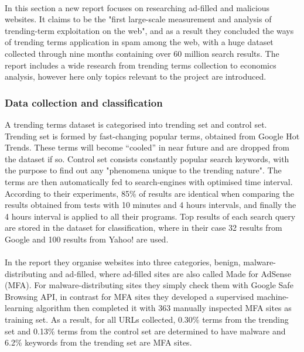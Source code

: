 \paragraph{}
In this section a new report focuses on researching ad-filled and malicious
websites.\cite{moore2011fashion} It claims to be the "first large-scale measurement
and analysis of trending-term exploitation on the web", and as a result they
concluded the ways of trending terms application in spam among the web, with a
huge dataset collected through nine months containing over 60 million search
results. The report includes a wide research from trending terms collection to 
economics analysis, however here only topics relevant to the 
project are introduced. 
\subsubsection{Data collection and classification}
A trending terms dataset is categorised into trending set and control set. 
Trending set is formed by fast-changing popular terms, obtained from Google 
Hot Trends. These terms will become ``cooled'' in near future and are dropped 
from the dataset if so. Control set consists constantly popular search 
keywords, with the purpose to find out any "phenomena unique to the trending 
nature".\cite{moore2011fashion} The terms are then automatically fed to search-engines with optimised 
time interval. According to their experiments, 85\% of results are identical 
when comparing the results obtained from tests with 10 minutes and 4 hours 
intervals, and finally the 4 hours interval is applied to all their programs. Top 
results of each search query are stored in the dataset for classification, 
where in their case 32 results from Google and 100 results from Yahoo! are used.
\paragraph{}
In the report they organise websites into three categories, benign, 
malware-distributing and ad-filled, where ad-filled sites are also called Made 
for AdSense (MFA). For malware-distributing sites they simply check them with 
Google Safe Browsing API, in contrast for MFA sites they developed a 
supervised machine-learning algorithm then completed it with 363 manually 
inspected MFA sites as training set. As a result, for all URLs collected, 
0.30\% terms from the trending set and 0.13\% terms from the control set are determined to 
have malware and 6.2\% keywords from the trending set are MFA sites. 
